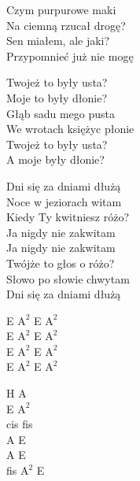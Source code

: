 \begin{text}
    Czym purpurowe maki\\
    Na ciemną rzucał drogę?\\
    Sen miałem, ale jaki?\\
    Przypomnieć już nie mogę

    Twojeż to były usta?\\
    Moje to były dłonie?\\
    Głąb sadu mego pusta\\
    We wrotach księżyc płonie\\
    Twojeż to były usta?\\
    A moje były dłonie?

    Dni się za dniami dłużą\\
    Noce w jeziorach witam\\
    Kiedy Ty kwitniesz różo?\\
    Ja nigdy nie zakwitam\\
    Ja nigdy nie zakwitam\\
    Twójże to głos o różo?\\
    Słowo po słowie chwytam\\
    Dni się za dniami dłużą
\end{text}
\begin{chord}
    E $\mathrm{A^{2}}$ E $\mathrm{A^{2}}$\\
    E $\mathrm{A^{2}}$ E $\mathrm{A^{2}}$\\
    E $\mathrm{A^{2}}$ E $\mathrm{A^{2}}$\\
    E $\mathrm{A^{2}}$ E $\mathrm{A^{2}}$

    H A\\
    E $\mathrm{A^{2}}$\\
    cis fis\\
    A E\\
    A E\\
    fis $\mathrm{A^{2}}$ E
\end{chord}
